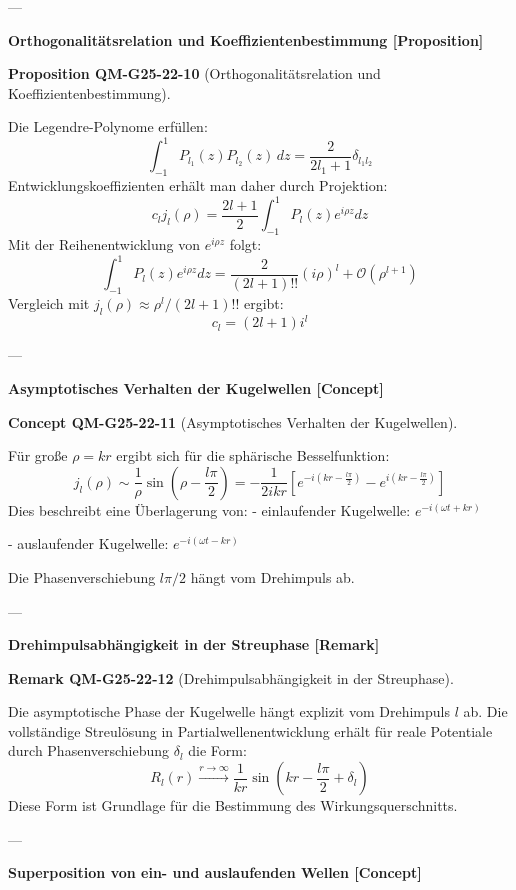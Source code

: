 \documentclass[10pt, letterpaper]{article}
\newcommand{\CustomHeading}[3]{%
  \par\medskip\noindent%
  \textbf{#1 #2} \textnormal{(#3)}.\enskip%
}
\newenvironment{PROP}[2]{\begin{unitbox}\CustomHeading{Proposition}{#1}{#2}}{\end{unitbox}}
\newenvironment{REM}[2]{\begin{unitbox}\CustomHeading{Remark}{#1}{#2}}{\end{unitbox}}
\newenvironment{CONC}[2]{\begin{unitbox}\CustomHeading{Concept}{#1}{#2}}{\end{unitbox}}
\begin{document}
---

\textbf{Orthogonalitätsrelation und Koeffizientenbestimmung [Proposition]}

\begin{PROP}{QM-G25-22-10}{Orthogonalitätsrelation und Koeffizientenbestimmung}
Die Legendre-Polynome erfüllen:
\[
\int_{-1}^{1} P_{l_1}(z) P_{l_2}(z) \, dz = \frac{2}{2l_1 + 1} \delta_{l_1 l_2}
\]
Entwicklungskoeffizienten erhält man daher durch Projektion:
\[
c_l j_l(\rho) = \frac{2l+1}{2} \int_{-1}^{1} P_l(z) e^{i \rho z} dz
\]
Mit der Reihenentwicklung von $e^{i \rho z}$ folgt:
\[
\int_{-1}^{1} P_l(z) e^{i \rho z} dz = \frac{2}{(2l+1)!!} (i \rho)^l + \mathcal{O}(\rho^{l+1})
\]
Vergleich mit $j_l(\rho) \approx \rho^l / (2l+1)!!$ ergibt:
\[
c_l = (2l+1) i^l
\]
\end{PROP}

---

\textbf{Asymptotisches Verhalten der Kugelwellen [Concept]}

\begin{CONC}{QM-G25-22-11}{Asymptotisches Verhalten der Kugelwellen}
Für große $\rho = kr$ ergibt sich für die sphärische Besselfunktion:
\[
j_l(\rho) \sim \frac{1}{\rho} \sin \left( \rho - \frac{l\pi}{2} \right) = -\frac{1}{2ikr} \left[ e^{-i(kr - \frac{l\pi}{2})} - e^{i(kr - \frac{l\pi}{2})} \right]
\]
Dies beschreibt eine Überlagerung von:
- einlaufender Kugelwelle: $e^{-i(\omega t + kr)}$

- auslaufender Kugelwelle: $e^{-i(\omega t - kr)}$

Die Phasenverschiebung $l\pi/2$ hängt vom Drehimpuls ab.
\end{CONC}

---

\textbf{Drehimpulsabhängigkeit in der Streuphase [Remark]}

\begin{REM}{QM-G25-22-12}{Drehimpulsabhängigkeit in der Streuphase}
Die asymptotische Phase der Kugelwelle hängt explizit vom Drehimpuls $l$ ab. Die vollständige Streulösung in Partialwellenentwicklung erhält für reale Potentiale durch Phasenverschiebung $\delta_l$ die Form:
\[
R_l(r) \xrightarrow{r \to \infty} \frac{1}{kr} \sin \left( kr - \frac{l\pi}{2} + \delta_l \right)
\]
Diese Form ist Grundlage für die Bestimmung des Wirkungsquerschnitts.
\end{REM}

---

\textbf{Superposition von ein- und auslaufenden Wellen [Concept]}
\end{document}
